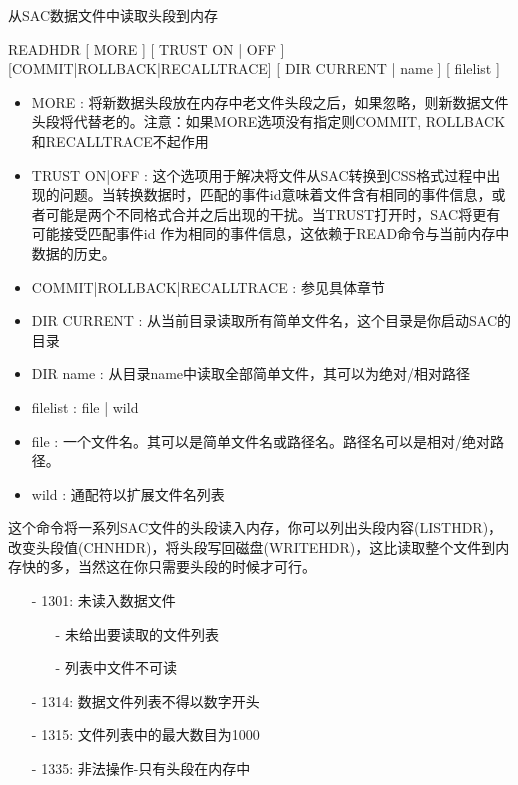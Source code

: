 \label{cmd:readhdr}

从SAC数据文件中读取头段到内存

READHDR [ MORE ] [ TRUST ON | OFF ] [COMMIT|ROLLBACK|RECALLTRACE] [ DIR CURRENT | name ] [ filelist ]

\begin{itemize}
\item MORE : 将新数据头段放在内存中老文件头段之后，如果忽略，则新数据文件头段将代替老的。注意：如果MORE选项没有指定则COMMIT, ROLLBACK和RECALLTRACE不起作用\\
\item TRUST ON|OFF : 这个选项用于解决将文件从SAC转换到CSS格式过程中出现的问题。当转换数据时，匹配的事件id意味着文件含有相同的事件信息，或者可能是两个不同格式合并之后出现的干扰。当TRUST打开时，SAC将更有可能接受匹配事件id 作为相同的事件信息，这依赖于READ命令与当前内存中数据的历史。
\item COMMIT|ROLLBACK|RECALLTRACE  : 参见具体章节 
\item DIR CURRENT : 从当前目录读取所有简单文件名，这个目录是你启动SAC的目录 
\item DIR name : 从目录name中读取全部简单文件，其可以为绝对/相对路径 
\item filelist :  file | wild 
\item file : 一个文件名。其可以是简单文件名或路径名。路径名可以是相对/绝对路径。 
\item wild : 通配符以扩展文件名列表 
\end{itemize}

这个命令将一系列SAC文件的头段读入内存，你可以列出头段内容(LISTHDR)，改变头段值(CHNHDR)，将头段写回磁盘(WRITEHDR)，这比读取整个文件到内存快的多，当然这在你只需要头段的时候才可行。

\begin{itemize}
\item[-]1301: 未读入数据文件
	\begin{itemize}
	\item[-]未给出要读取的文件列表
	\item[-]列表中文件不可读
	\end{itemize}
	\item[-]1314: 数据文件列表不得以数字开头
	\item[-]1315: 文件列表中的最大数目为1000
	\item[-]1335: 非法操作-只有头段在内存中
\end{itemize}

